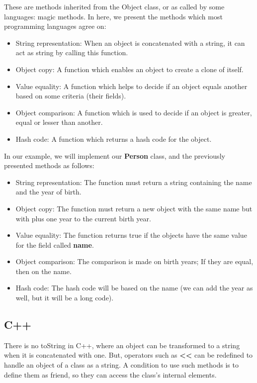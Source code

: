 \documentclass{KodeBook}
\begin{document}
These are methods inherited from the Object class, or as called by some languages: magic methods.
In here, we present the methods which most programming languages agree on:
\begin{itemize}
	\item String representation: When an object is concatenated with a string, it can act as string by calling this function.
	\item Object copy: A function which enables an object to create a clone of itself.
	\item Value equality: A function which helps to decide if an object equals another based on some criteria (their fields).
	\item Object comparison: A function which is used to decide if an object is greater, equal or lesser than another.
	\item Hash code: A function which returns a hash code for the object. 
\end{itemize}

In our example, we will implement our \textbf{Person} class, and the previously presented methods as follows:
\begin{itemize}
	\item String representation: The function must return a string containing the name and the year of birth.
	\item Object copy: The function must return a new object with the same name but with plus one year to the current birth year.
	\item Value equality: The function returns true if the objects have the same value for the field called \textbf{name}.
	\item Object comparison: The comparison is made on birth years; If they are equal, then on the name.
	\item Hash code: The hash code will be based on the name (we can add the year as well, but it will be a long code). 
\end{itemize}


\subsection{C++}

There is no toString in C++, where an object can be transformed to a string when it is concatenated with one. 
But, operators such as \textbf{<<} can be redefined to handle an object of a class as a string. 
A condition to use such methods is to define them as friend, so they can access the class's internal elements.  
\end{document}
